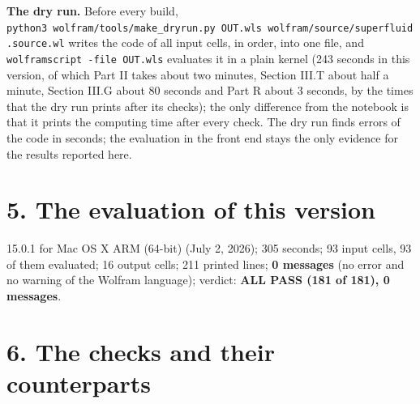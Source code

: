 \documentclass[
  10pt,
]{article}
\begin{document}
\textbf{The dry run.} Before every build,
\texttt{python3\ wolfram/tools/make\_dryrun.py\ OUT.wls\ wolfram/source/superfluid.source.wl}
writes the code of all input cells, in order, into one file, and
\texttt{wolframscript\ -file\ OUT.wls} evaluates it in a plain kernel
(243 seconds in this version, of which Part II takes about two minutes,
Section III.T about half a minute, Section III.G about 80 seconds and
Part R about 3 seconds, by the times that the dry run prints after its
checks); the only difference from the notebook is that it prints the
computing time after every check. The dry run finds errors of the code
in seconds; the evaluation in the front end stays the only evidence for
the results reported here.

\hypertarget{the-evaluation-of-this-version}{%
\section{5. The evaluation of this
version}\label{the-evaluation-of-this-version}}

15.0.1 for Mac OS X ARM (64-bit) (July 2, 2026); 305 seconds; 93 input
cells, 93 of them evaluated; 16 output cells; 211 printed lines;
\textbf{0 messages} (no error and no warning of the Wolfram language);
verdict: \textbf{ALL PASS (181 of 181), 0 messages}.

\hypertarget{the-checks-and-their-counterparts}{%
\section{6. The checks and their
counterparts}\label{the-checks-and-their-counterparts}}
\end{document}

